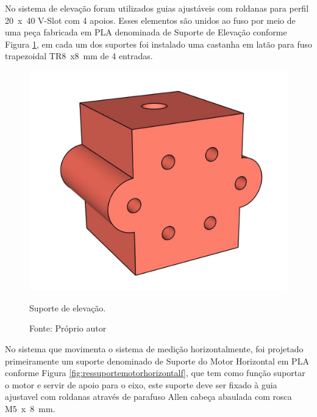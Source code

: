 \pagebreak

No sistema de elevação foram utilizados guias ajustáveis com roldanas para perfil 20~x~40 V-Slot 
com 4 apoios. Esses elementos são unidos ao fuso por meio de uma peça fabricada em \ac{PLA} 
denominada de Suporte de Elevação conforme Figura \ref{fig:ressuporteelevacao}, em cada um dos 
suportes foi instalado uma castanha em latão para fuso trapezoidal TR8~x8~mm de 4 entradas.

\begin{figure}[H]
\centering
\includegraphics[scale = 0.4]{figuras/ressuporteelevacao}
\caption{Suporte de elevação.}
\caption*{Fonte: Próprio autor}
\label{fig:ressuporteelevacao}
\end{figure}
        
\pagebreak

No sistema que movimenta o sistema de medição horizontalmente, foi projetado primeiramente 
um suporte denominado de Suporte do Motor Horizontal em \ac{PLA} conforme Figura \ref{fig:ressuportemotorhorizontalf}, 
que tem como função suportar o motor e servir de apoio para o eixo, este suporte deve ser fixado 
à guia ajustavel com roldanas através de parafuso Allen cabeça abaulada com rosca M5~x~8~mm.

